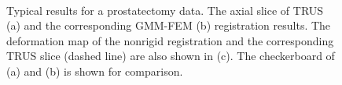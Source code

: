 \documentclass[journal]{IEEEtran}
\begin{document}
\begin{figure}[t]
	\centering
	\hfill
	\\
	\hfill
   \caption{Typical results for a prostatectomy data. The axial slice of TRUS (a) and the corresponding GMM-FEM (b) registration results. The deformation map of the nonrigid registration and the corresponding TRUS slice (dashed line) are also shown in (c). The checkerboard of (a) and (b) is shown for comparison. \label{fig:exp2fig2}}
\end{figure}
\end{document}
